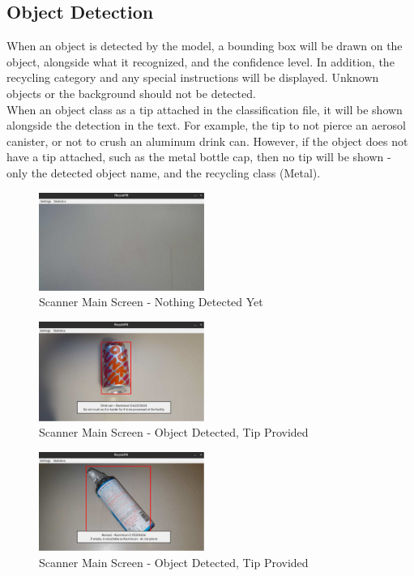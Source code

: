 \documentclass[conference]{IEEEtran}
\begin{document}
\newpage
\subsection{Object Detection}
When an object is detected by the model, a bounding box will be drawn on the object, alongside what it recognized, and the confidence level. In addition, the recycling category and any special instructions will be displayed. Unknown objects or the background should not be detected.~\\

When an object class as a tip attached in the classification file, it will be shown alongside the detection in the text. For example, the tip to not pierce an aerosol canister, or not to crush an aluminum drink can. However, if the object does not have a tip attached, such as the metal bottle cap, then no tip will be shown - only the detected object name, and the recycling class (Metal).

\begin{figure}[!h]
    \centering
    \includegraphics[width=0.48\textwidth]{images/nothing_detected.eps}
    \caption{Scanner Main Screen - Nothing Detected Yet}
\end{figure}

\begin{figure}[!h]
    \centering
    \includegraphics[width=0.48\textwidth]{images/successful_detection.eps}
    \caption{Scanner Main Screen - Object Detected, Tip Provided}
\end{figure}

\begin{figure}[!h]
    \centering
    \includegraphics[width=0.48\textwidth]{images/aerosol_detected.eps}
    \caption{Scanner Main Screen - Object Detected, Tip Provided}
\end{figure}
\end{document}
